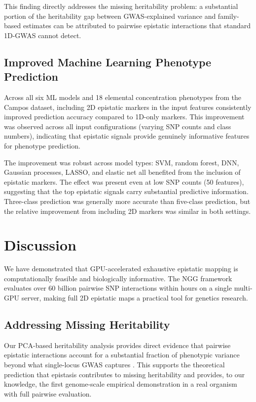 \documentclass[11pt]{article}
\begin{document}
This finding directly addresses the missing heritability problem: a substantial portion of the heritability gap between GWAS-explained variance and family-based estimates can be attributed to pairwise epistatic interactions that standard 1D-GWAS cannot detect.

\subsection{Improved Machine Learning Phenotype Prediction}

Across all six ML models and 18 elemental concentration phenotypes from the Campos dataset, including 2D epistatic markers in the input features consistently improved prediction accuracy compared to 1D-only markers. This improvement was observed across all input configurations (varying SNP counts and class numbers), indicating that epistatic signals provide genuinely informative features for phenotype prediction.

The improvement was robust across model types: SVM, random forest, DNN, Gaussian processes, LASSO, and elastic net all benefited from the inclusion of epistatic markers. The effect was present even at low SNP counts (50 features), suggesting that the top epistatic signals carry substantial predictive information. Three-class prediction was generally more accurate than five-class prediction, but the relative improvement from including 2D markers was similar in both settings.

\section{Discussion}

We have demonstrated that GPU-accelerated exhaustive epistatic mapping is computationally feasible and biologically informative. The NGG framework evaluates over 60 billion pairwise SNP interactions within hours on a single multi-GPU server, making full 2D epistatic maps a practical tool for genetics research.

\subsection{Addressing Missing Heritability}

Our PCA-based heritability analysis provides direct evidence that pairwise epistatic interactions account for a substantial fraction of phenotypic variance beyond what single-locus GWAS captures \citep{manolio2009, zuk2012}. This supports the theoretical prediction that epistasis contributes to missing heritability and provides, to our knowledge, the first genome-scale empirical demonstration in a real organism with full pairwise evaluation.
\end{document}
